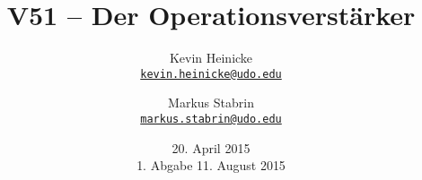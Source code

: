 


\title{%
    V51 -- Der Operationsverstärker
}
\author{%
    Kevin Heinicke\\
    \texttt{\href{mailto:kevin.heinicke@udo.edu}{kevin.heinicke@udo.edu}}
    \and
    Markus Stabrin\\
    \texttt{\href{mailto:markus.stabrin@udo.edu}{markus.stabrin@udo.edu}}
}
\date{%
    20. April 2015\\
    {\small 1. Abgabe} 11. August 2015
}

    \maketitle%
    \tableofcontents
    \newpage
    
    
    

    \printbibliography

